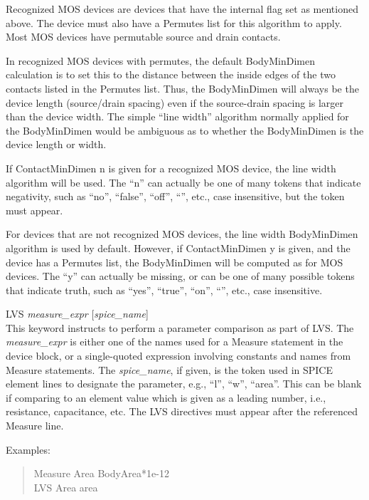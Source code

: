 \begin{description}
Recognized MOS devices are devices that have the internal flag set as
mentioned above.  The device must also have a {\vt Permutes} list for
this algorithm to apply.  Most MOS devices have permutable source and
drain contacts.

In recognized MOS devices with permutes, the default {\et
BodyMinDimen} calculation is to set this to the distance between the
inside edges of the two contacts listed in the {\et Permutes} list. 
Thus, the {\et BodyMinDimen} will always be the device length
(source/drain spacing) even if the source-drain spacing is larger than
the device width.  The simple ``line width'' algorithm normally
applied for the {\et BodyMinDimen} would be ambiguous as to whether
the {\et BodyMinDimen} is the device length or width.

If {\et ContactMinDimen n} is given for a recognized MOS device, the
line width algorithm will be used.  The ``{\vt n}'' can actually be
one of many tokens that indicate negativity, such as ``{\vt no}'',
``{\vt false}'', ``{\vt off}'', ``{}'', etc., case insensitive,
but the token must appear.

For devices that are not recognized MOS devices, the line width {\et
BodyMinDimen} algorithm is used by default.  However, if {\et
ContactMinDimen y} is given, and the device has a {\et Permutes} list,
the {\et BodyMinDimen} will be computed as for MOS devices.  The
``{\vt y}'' can actually be missing, or can be one of many possible
tokens that indicate truth, such as ``{\vt yes}'', ``{\vt true}'',
``{\vt on}'', ``{}'', etc., case insensitive.

\item{\et LVS} {\it measure\_expr} [{\it spice\_name}]\\
This keyword instructs {\Xic} to perform a parameter comparison as
part of LVS.  The {\it measure\_expr} is either one of the names used
for a {\et Measure} statement in the device block, or a single-quoted
expression involving constants and names from {\et Measure}
statements.  The {\it spice\_name}, if given, is the token used in
SPICE element lines to designate the parameter, e.g., ``l'', ``w'',
``area''.  This can be blank if comparing to an element value which is
given as a leading number, i.e., resistance, capacitance, etc.  The
{\et LVS} directives must appear after the referenced {\et Measure}
line.

Examples:

\begin{quote}\rr\vt
Measure Area BodyArea*1e-12\\
LVS Area area\\
\end{quote}


\end{description}
